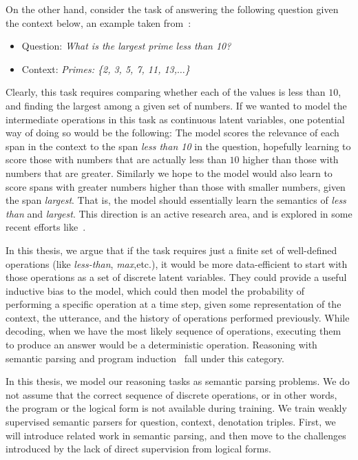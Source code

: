 On the other hand, consider the task of answering the following question given
the context below, an example taken from~\cite{liang2016learning}:
\begin{itemize}
	\item[] Question: \textit{What is the largest prime less than 10?}
	\item[] Context: \textit{Primes: \{2, 3, 5, 7, 11, 13,$\ldots$\}}
\end{itemize}

Clearly, this task requires comparing whether each of the values is less than
$10$, and finding the largest among a given set of numbers.
If we wanted to model the intermediate operations in this task as continuous latent
variables, one potential way of doing so would be the following: The model
scores the relevance of each span in the context to the span \textit{less than 10} in the
question, hopefully learning to score those with numbers that are actually less than $10$
higher than those with numbers that are greater. Similarly we hope to the model
would also learn to score spans with greater numbers higher than those with
smaller numbers, given the span \textit{largest}. That is, the model
should essentially learn the semantics of \textit{less than} and
\textit{largest}. This direction is an active research area, and is explored in
some recent efforts like~\cite[among
others]{andreas2016neural,trask2018neural,hudson2018compositional}.

In this thesis, we argue that if the task requires just a finite set of
well-defined operations (like \textit{less-than},
\textit{max},etc.), it would be more data-efficient to start with those
operations as a set of discrete latent variables. They could provide a useful
inductive bias to the model, which could then model the probability of
performing a specific
operation at a time step, given some representation of the context, the utterance, and the
history of operations performed previously. While decoding, when we have the
most likely sequence of operations, executing them to produce an answer would be a
deterministic operation. Reasoning with semantic parsing and program induction~\citep[among
others]{krishnamurthy2012weakly,berant2013semantic,artzi2013,kushman2014,krishnamurthy2017neural}
fall under this category.

In this thesis, we model our reasoning tasks as
semantic parsing problems. We do not assume that the correct sequence of
discrete operations, or in other words, the program or the logical form is not
available during training. We train weakly supervised semantic parsers for
question, context, denotation triples. First, we will introduce related work in
semantic parsing, and then move to the challenges introduced by the lack of
direct supervision from logical forms.

